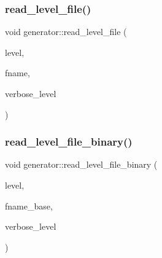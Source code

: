 \mbox{\label{classgenerator_a2f706a252cb52357a8c214972a50c994}} 
\subsubsection{\texorpdfstring{read\+\_\+level\+\_\+file()}{read\_level\_file()}}
{\footnotesize\ttfamily void generator\+::read\+\_\+level\+\_\+file (\begin{DoxyParamCaption}\item[{\mbox{\hyperlink{galois_8h_a09fddde158a3a20bd2dcadb609de11dc}{I\+NT}}}]{level,  }\item[{\mbox{\hyperlink{galois_8h_ab6cc7b4aeb6ea31aba2b3fbfc83ff5e6}{B\+Y\+TE}} $\ast$}]{fname,  }\item[{\mbox{\hyperlink{galois_8h_a09fddde158a3a20bd2dcadb609de11dc}{I\+NT}}}]{verbose\+\_\+level }\end{DoxyParamCaption})}

\mbox{\label{classgenerator_a03b82a8bd61e9d6af1a8c114274b2be2}} 
\subsubsection{\texorpdfstring{read\+\_\+level\+\_\+file\+\_\+binary()}{read\_level\_file\_binary()}}
{\footnotesize\ttfamily void generator\+::read\+\_\+level\+\_\+file\+\_\+binary (\begin{DoxyParamCaption}\item[{\mbox{\hyperlink{galois_8h_a09fddde158a3a20bd2dcadb609de11dc}{I\+NT}}}]{level,  }\item[{\mbox{\hyperlink{galois_8h_ab6cc7b4aeb6ea31aba2b3fbfc83ff5e6}{B\+Y\+TE}} $\ast$}]{fname\+\_\+base,  }\item[{\mbox{\hyperlink{galois_8h_a09fddde158a3a20bd2dcadb609de11dc}{I\+NT}}}]{verbose\+\_\+level }\end{DoxyParamCaption})}

\mbox{\label{classgenerator_a1122a5fc388f2ca946f920ed965eb8b7}} 
